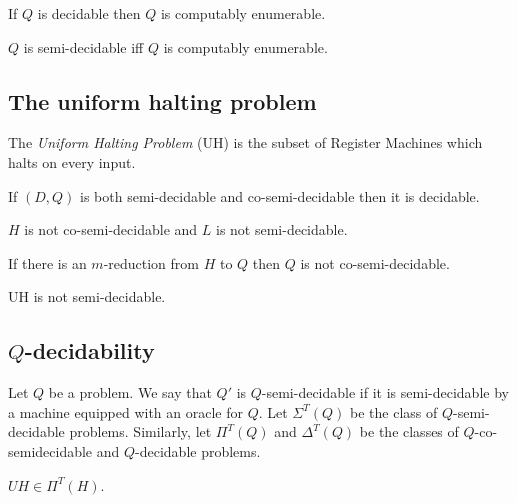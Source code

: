 \documentclass{article}
\begin{document}
\begin{theorem}[Notes I.25]
    If $Q$ is decidable then $Q$ is computably enumerable.
\end{theorem}

\begin{theorem}[Notes I.26, I.27]
    $Q$ is semi-decidable iff $Q$ is computably enumerable.
\end{theorem}

\subsection{The uniform halting problem}

\begin{definition}
    The \emph{Uniform Halting Problem} (UH) is the subset of Register Machines
    which halts on every input.
\end{definition}

\begin{theorem}[Notes I.28]
    If $(D,Q)$ is both semi-decidable and co-semi-decidable then it is decidable.
\end{theorem}

\begin{corollary}
    $H$ is not co-semi-decidable and $L$ is not semi-decidable.
\end{corollary}

\begin{corollary}
    If there is an $m$-reduction from $H$ to $Q$ then $Q$ is not co-semi-decidable.
\end{corollary}

\begin{theorem}[Notes I.31]
    UH is not semi-decidable. 
\end{theorem}

\subsection{$Q$-decidability}

\begin{definition}
    Let $Q$ be a problem. We say that $Q'$ is $Q$-semi-decidable if it is semi-decidable
    by a machine equipped with an oracle for $Q$. Let $\Sigma^T(Q)$ be the class of
    $Q$-semi-decidable problems. Similarly, let $\Pi^T(Q)$ and $\Delta^T(Q)$ be the 
    classes of $Q$-co-semidecidable and $Q$-decidable problems.
\end{definition}

\begin{theorem}
    $UH\in\Pi^T(H)$.
\end{theorem}
\end{document}
